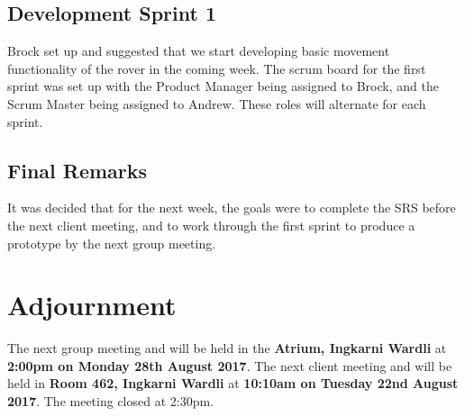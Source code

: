 \documentclass{article}
\begin{document}
    \subsection{Development Sprint 1}
    Brock set up and suggested that we start developing basic movement functionality of the rover in the coming week. The scrum board for the first sprint was set up with the Product Manager being assigned to Brock, and the Scrum Master being assigned to Andrew. These roles will alternate for each sprint.

\subsection{Final Remarks}
It was decided that for the next week, the goals were to complete the SRS before the next client meeting, and to work through the first sprint to produce a prototype by the next group meeting.
     
\section{Adjournment}
	The next group meeting and will be held in the {\bf Atrium, Ingkarni Wardli} at {\bf 2:00pm on Monday 28th August 2017}.\newline
    The next client meeting and will be held in {\bf Room 462, Ingkarni Wardli} at {\bf 10:10am on Tuesday 22nd August 2017}.\newline
The meeting closed at 2:30pm.
\end{document}
